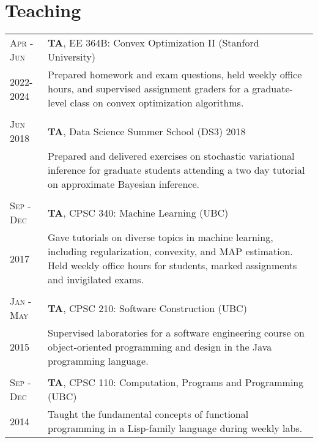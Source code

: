 \documentclass[10pt]{article}
\begin{document}
\section{Teaching}
\begin{longtable}
    {R{1.8cm}|L{11.8cm}}
    \textsc{Apr - Jun}        & \textbf{TA}, EE 364B: Convex Optimization II (Stanford University)                                                                                                       \\
    \vspace{0.3cm}2022-2024 & {\small Prepared homework and exam questions, held weekly office hours, and supervised assignment graders for a graduate-level class on convex optimization algorithms.} \\   \\
    \textsc{ Jun 2018}      & \textbf{TA}, Data Science Summer School (DS3) 2018                                                                                                                       \\
                            & {\small Prepared and delivered exercises on stochastic variational inference for graduate students attending a two day tutorial on approximate Bayesian inference.}      \\  \\
    \textsc{Sep - Dec}      & \textbf{TA}, CPSC 340: Machine Learning                          (UBC)                                                                                                   \\
    \vspace{0.7cm} 2017     & {\small Gave tutorials on diverse topics in machine learning, including regularization, convexity, and MAP estimation.
            Held weekly office hours for students, marked assignments and invigilated
            exams.
    }                                                                                                                                                                                                  \\  \\
    \textsc{Jan - May}      & \textbf{TA}, CPSC 210: Software Construction                     (UBC)                                                                                                   \\
    \vspace{0.2cm}2015      & {\small Supervised laboratories for a software engineering course on object-oriented programming and design in the Java programming language.}                           \\  \\
    \textsc{Sep - Dec}      & \textbf{TA}, CPSC 110: Computation, Programs and Programming     (UBC)                                                                                                   \\
    \vspace{0.3cm}2014      & {\small Taught the fundamental concepts of functional programming in a Lisp-family language during weekly labs.}
\end{longtable}
\end{document}
